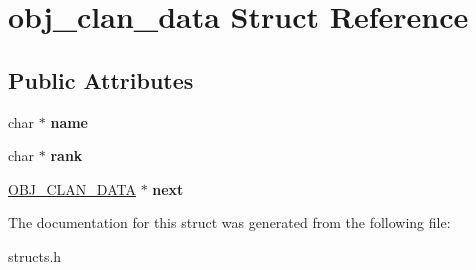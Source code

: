 \hypertarget{structobj__clan__data}{\section{obj\-\_\-clan\-\_\-data Struct Reference}
\label{structobj__clan__data}
}
\subsection*{Public Attributes}
\begin{DoxyCompactItemize}
\item 
\hypertarget{structobj__clan__data_a47b83061cf091f47ee8e25601bd64e4e}{char $\ast$ {\bfseries name}}\label{structobj__clan__data_a47b83061cf091f47ee8e25601bd64e4e}

\item 
\hypertarget{structobj__clan__data_a4a7e2b5c39a85d62df8e746823552dc1}{char $\ast$ {\bfseries rank}}\label{structobj__clan__data_a4a7e2b5c39a85d62df8e746823552dc1}

\item 
\hypertarget{structobj__clan__data_a62b665b5417bb431384e219d4dc212af}{\hyperlink{structobj__clan__data}{O\-B\-J\-\_\-\-C\-L\-A\-N\-\_\-\-D\-A\-T\-A} $\ast$ {\bfseries next}}\label{structobj__clan__data_a62b665b5417bb431384e219d4dc212af}

\end{DoxyCompactItemize}


The documentation for this struct was generated from the following file\-:\begin{DoxyCompactItemize}
\item 
structs.\-h\end{DoxyCompactItemize}
